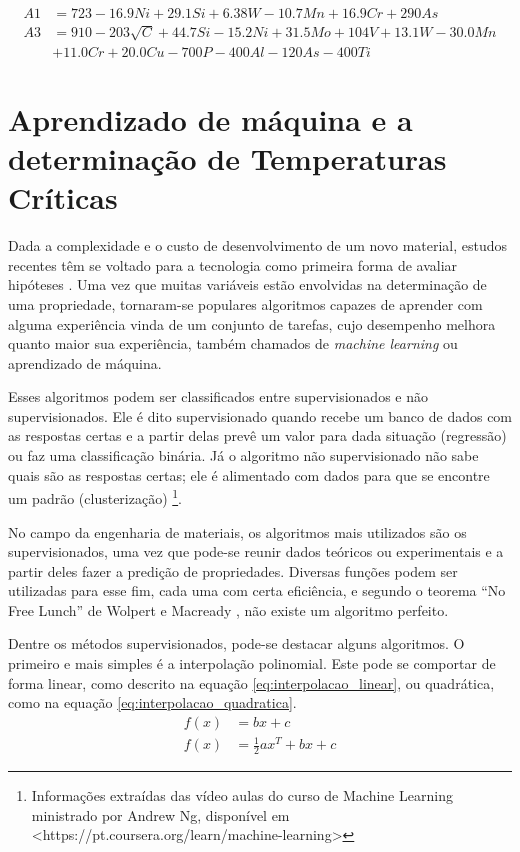 \documentclass[brazil,tese,epusp]{usp}
\begin{document}
\begin{align}
  A1 &= 723 - 16.9 Ni + 29.1 Si + 6.38 W - 10.7 Mn + 16.9 Cr + 290 As \label{eq:andrewsA1}\\
  A3 &= 910 - 203 \sqrt{C}  + 44.7 Si - 15.2 Ni + 31.5 Mo + 104 V + 13.1 W - 30.0 Mn \nonumber \\
     & + 11.0 Cr + 20.0 Cu - 700 P - 400 Al - 120 As - 400 Ti \label{eq:andrewsA3}
\end{align}

\section{Aprendizado de m\'aquina e a determinação de Temperaturas Cr\'iticas}

Dada a complexidade e o custo de desenvolvimento de um novo material, estudos recentes têm se voltado para a tecnologia como primeira forma de avaliar hipóteses \cite{Belisle2015}. Uma vez que muitas variáveis estão envolvidas na determinação de uma propriedade, tornaram-se populares algoritmos capazes de aprender com alguma experiência vinda de um conjunto de tarefas, cujo desempenho melhora quanto maior sua experiência, também chamados de \textit{machine learning} ou aprendizado de máquina.

Esses algoritmos podem ser classificados entre supervisionados e não supervisionados. Ele é dito supervisionado quando recebe um banco de dados com as respostas certas e a partir delas prevê um valor para dada situação (regressão) ou faz uma classificação binária. Já o algoritmo não supervisionado não sabe quais são as respostas certas; ele é alimentado com dados para que se encontre um padrão (clusterização) \footnote{Informações extraídas das vídeo aulas do curso de Machine Learning ministrado por Andrew Ng, disponível em <https://pt.coursera.org/learn/machine-learning>}.

No campo da engenharia de materiais, os algoritmos mais utilizados são os supervisionados, uma vez que pode-se reunir dados teóricos ou experimentais e a partir deles fazer a predição de propriedades. Diversas funções podem ser utilizadas para esse fim, cada uma com certa eficiência, e segundo o teorema ``No Free Lunch'' de Wolpert e Macready  , não existe um algoritmo perfeito.

Dentre os métodos supervisionados, pode-se destacar alguns algoritmos. O primeiro e mais simples é a interpolação polinomial. Este pode se comportar de forma linear, como descrito na equação \ref{eq:interpolacao_linear}, ou quadrática, como na equação \ref{eq:interpolacao_quadratica}.
\begin{align}
  f(x) &= b x + c \label{eq:interpolacao_linear} \\
  f(x) &= \frac{1}{2} a x^T + b x + c \label{eq:interpolacao_quadratica}
\end{align}
\end{document}
